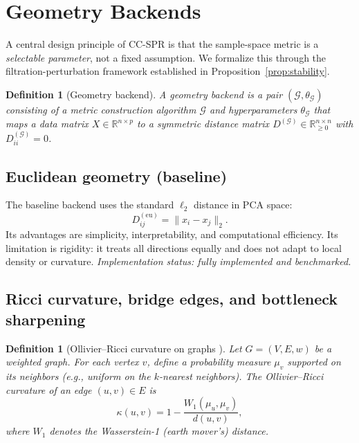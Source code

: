 \documentclass[11pt]{article}
\newtheorem{definition}[theorem]{Definition}
\begin{document}
\section{Geometry Backends}
\label{sec:backends}

A central design principle of CC-SPR is that the sample-space metric is a \emph{selectable parameter}, not a fixed assumption.
We formalize this through the filtration-perturbation framework established in Proposition~\ref{prop:stability}.

\begin{definition}[Geometry backend]\label{def:backend}
A \emph{geometry backend} is a pair $(\mathcal{G}, \theta_{\mathcal{G}})$ consisting of a metric construction algorithm $\mathcal{G}$ and hyperparameters $\theta_{\mathcal{G}}$ that maps a data matrix $X \in \mathbb{R}^{n \times p}$ to a symmetric distance matrix $D^{(\mathcal{G})} \in \mathbb{R}_{\ge 0}^{n \times n}$ with $D^{(\mathcal{G})}_{ii} = 0$.
\end{definition}

\subsection{Euclidean geometry (baseline)}

The baseline backend uses the standard $\ell_2$ distance in PCA space:
\[
D^{(\text{eu})}_{ij} = \|x_i - x_j\|_2.
\]
Its advantages are simplicity, interpretability, and computational efficiency.
Its limitation is rigidity: it treats all directions equally and does not adapt to local density or curvature.
\emph{Implementation status: fully implemented and benchmarked.}

\subsection{Ricci curvature, bridge edges, and bottleneck sharpening}
\label{sec:ricci}

\begin{definition}[Ollivier--Ricci curvature on graphs \cite{ollivier2007,ollivier2009}]\label{def:ricci}
Let $G = (V, E, w)$ be a weighted graph.
For each vertex $v$, define a probability measure $\mu_v$ supported on its neighbors (e.g., uniform on the $k$-nearest neighbors).
The \emph{Ollivier--Ricci curvature} of an edge $(u,v) \in E$ is
\[
\kappa(u,v) = 1 - \frac{W_1(\mu_u, \mu_v)}{d(u,v)},
\]
where $W_1$ denotes the Wasserstein-1 (earth mover's) distance.
\end{definition}
\end{document}
